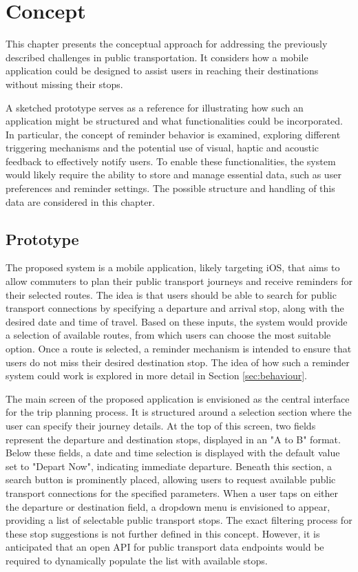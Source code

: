 \chapter{Concept}
\label{cha:Concept}

This chapter presents the conceptual approach for addressing the previously described challenges in public transportation.
It considers how a mobile application could be designed to assist users in reaching their destinations without missing their stops.

A sketched prototype serves as a reference for illustrating how such an application might be structured and what functionalities could be incorporated. 
In particular, the concept of reminder behavior is examined, exploring different triggering mechanisms and the potential use of visual, haptic and acoustic feedback to effectively notify users.
To enable these functionalities, the system would likely require the ability to store and manage essential data, such as user preferences and reminder settings. 
The possible structure and handling of this data are considered in this chapter.

\section{Prototype}
The proposed system is a mobile application, likely targeting iOS, that aims to allow commuters to plan their public transport journeys and receive reminders for their selected routes.
The idea is that users should be able to search for public transport connections by specifying a departure and arrival stop, along with the desired date and time of travel. 
Based on these inputs, the system would provide a selection of available routes, from which users can choose the most suitable option. 
Once a route is selected, a reminder mechanism is intended to ensure that users do not miss their desired destination stop. 
The idea of how such a reminder system could work is explored in more detail in Section \ref{sec:behaviour}.

The main screen of the proposed application is envisioned as the central interface for the trip planning process. 
It is structured around a selection section where the user can specify their journey details. 
At the top of this screen, two fields represent the departure and destination stops, displayed in an "A to B" format. 
Below these fields, a date and time selection is displayed with the default value set to "Depart Now", indicating immediate departure. 
Beneath this section, a search button is prominently placed, allowing users to request available public transport connections for the specified parameters.
When a user taps on either the departure or destination field, a dropdown menu is envisioned to appear, providing a list of selectable public transport stops. 
The exact filtering process for these stop suggestions is not further defined in this concept. 
However, it is anticipated that an open \ac{API} for public transport data endpoints would be required to dynamically populate the list with available stops.


